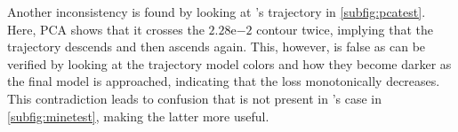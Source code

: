 \documentclass[letterpaper]{article} %
\begin{document}
          Another inconsistency is found by looking at \nn{}'s trajectory in \cref{subfig:pcatest}. Here, PCA shows that it crosses the $2.28\mathrm{e}{-2}$ contour twice, implying that the trajectory descends and then ascends again. This, however, is false as can be verified by looking at the trajectory model colors and how they become darker as the final model is approached, indicating that the loss monotonically decreases. This contradiction leads to confusion
          that is not present in \proposedautencoder{}'s case in \cref{subfig:minetest}, making the latter more useful. 
          
                     
\end{document}
